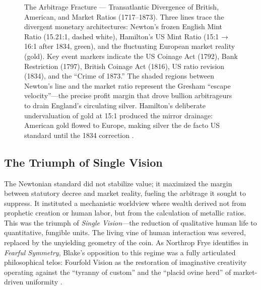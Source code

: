 \documentclass[
]{article}
\makeatletter
\newcommand*\pandocbounded[1]{%
  \sbox\pandoc@box{#1}%
  \Gscale@div\@tempa{\textheight}{\dimexpr\ht\pandoc@box+\dp\pandoc@box\relax}%
  \Gscale@div\@tempb{\linewidth}{\wd\pandoc@box}%
  \ifdim\@tempb\p@<\@tempa\p@\let\@tempa\@tempb\fi%
  \ifdim\@tempa\p@<\p@\scalebox{\@tempa}{\usebox\pandoc@box}%
  \else\usebox{\pandoc@box}%
  \fi%
}
\makeatother
\begin{document}
\begin{figure}
\centering
\pandocbounded{\includegraphics[keepaspectratio,alt={The Arbitrage Fracture --- Transatlantic Divergence of British, American, and Market Ratios (1717--1873). Three lines trace the divergent monetary architectures: Newton's frozen English Mint Ratio (15.21:1, dashed white), Hamilton's US Mint Ratio (15:1 → 16:1 after 1834, green), and the fluctuating European market reality (gold). Key event markers indicate the US Coinage Act (1792), Bank Restriction (1797), British Coinage Act (1816), US ratio revision (1834), and the ``Crime of 1873.'' The shaded regions between Newton's line and the market ratio represent the Gresham ``escape velocity''---the precise profit margin that drove bullion arbitrageurs to drain England's circulating silver. Hamilton's deliberate undervaluation of gold at 15:1 produced the mirror drainage: American gold flowed to Europe, making silver the de facto US standard until the 1834 correction {[}@flandreau1996bimetallism; @laughlin1898bimetallism{]}.}]{../figures/historic_ratio.png}}
\caption{The Arbitrage Fracture --- Transatlantic Divergence of British,
American, and Market Ratios (1717--1873). Three lines trace the
divergent monetary architectures: Newton's frozen English Mint Ratio
(15.21:1, dashed white), Hamilton's US Mint Ratio (15:1 → 16:1 after
1834, green), and the fluctuating European market reality (gold). Key
event markers indicate the US Coinage Act (1792), Bank Restriction
(1797), British Coinage Act (1816), US ratio revision (1834), and the
``Crime of 1873.'' The shaded regions between Newton's line and the
market ratio represent the Gresham ``escape velocity''---the precise
profit margin that drove bullion arbitrageurs to drain England's
circulating silver. Hamilton's deliberate undervaluation of gold at 15:1
produced the mirror drainage: American gold flowed to Europe, making
silver the de facto US standard until the 1834 correction
\citep{flandreau1996bimetallism, laughlin1898bimetallism}.}\label{fig-historic-ratio}
\end{figure}

\subsection{The Triumph of Single
Vision}\label{the-triumph-of-single-vision}

The Newtonian standard did not stabilize value; it maximized the margin
between statutory decree and market reality, fueling the arbitrage it
sought to suppress. It instituted a mechanistic worldview where wealth
derived not from prophetic creation or human labor, but from the
calculation of metallic ratios. This was the triumph of \emph{Single
Vision}---the reduction of qualitative human life to quantitative,
fungible units. The living vine of human interaction was severed,
replaced by the unyielding geometry of the coin. As Northrop Frye
identifies in \emph{Fearful Symmetry}, Blake's opposition to this regime
was a fully articulated philosophical telos: Fourfold Vision as the
restoration of imaginative creativity operating against the ``tyranny of
custom'' and the ``placid ovine herd'' of market-driven uniformity
\citep{frye1947fearful}.
\end{document}
